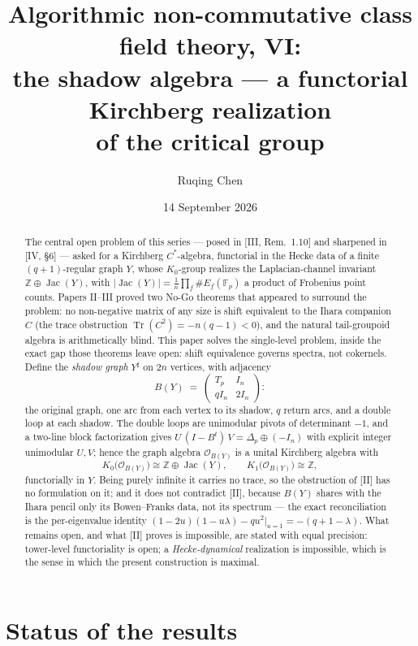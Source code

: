 \documentclass[11pt]{amsart}
\title[Algorithmic non-commutative class field theory, VI]
{Algorithmic non-commutative class field theory, VI:\\
the shadow algebra --- a functorial Kirchberg realization\\ of the critical group}
\author{Ruqing Chen}
\date{14 September 2026}
\numberwithin{equation}{section}
\theoremstyle{definition}
\theoremstyle{remark}
\newcommand{\Z}{\mathbb{Z}}
\newcommand{\F}{\mathbb{F}}
\newcommand{\cO}{\mathcal{O}}
\newcommand{\Jac}{\operatorname{Jac}}
\newcommand{\Tr}{\operatorname{Tr}}
\newcommand{\shadow}{Y^{\sharp}}
\begin{document}
\begin{abstract}
The central open problem of this series --- posed in [III, Rem.~1.10] and sharpened
in [IV, \S6] --- asked for a Kirchberg $C^*$-algebra, functorial in the Hecke data of
a finite $(q+1)$-regular graph $Y$, whose $K_0$-group realizes the Laplacian-channel
invariant $\Z\oplus\Jac(Y)$, with $|\Jac(Y)|=\frac1n\prod_f\#E_f(\F_p)$ a product of
Frobenius point counts. Papers II--III proved two No-Go theorems that appeared to
surround the problem: no non-negative matrix of any size is shift equivalent to the
Ihara companion $C$ (the trace obstruction $\Tr(C^2)=-n(q-1)<0$), and the natural
tail-groupoid algebra is arithmetically blind. This paper solves the single-level
problem, inside the exact gap those theorems leave open: shift equivalence governs
spectra, not cokernels. Define the \emph{shadow graph} $\shadow$ on $2n$ vertices,
with adjacency
\[
B(Y)\;=\;\begin{pmatrix}T_p& I_n\\ qI_n & 2I_n\end{pmatrix}:
\]
the original graph, one arc from each vertex to its shadow, $q$ return arcs, and a
double loop at each shadow. The double loops are unimodular pivots of determinant
$-1$, and a two-line block factorization gives
$U\,(I-B^t)\,V=\Delta_p\oplus(-I_n)$ with explicit integer unimodular $U,V$; hence
the graph algebra $\cO_{B(Y)}$ is a unital Kirchberg algebra with
\[
K_0\bigl(\cO_{B(Y)}\bigr)\cong\Z\oplus\Jac(Y),\qquad
K_1\bigl(\cO_{B(Y)}\bigr)\cong\Z,
\]
functorially in $Y$. Being purely infinite it carries no trace, so the obstruction of
[II] has no formulation on it; and it does not contradict [II], because $B(Y)$ shares
with the Ihara pencil only its Bowen--Franks data, not its spectrum --- the exact
reconciliation is the per-eigenvalue identity
$(1-2u)(1-u\lambda)-qu^2\big|_{u=1}=-(q+1-\lambda)$. What remains open, and what [II]
proves is impossible, are stated with equal precision: tower-level functoriality is
open; a \emph{Hecke-dynamical} realization is impossible, which is the sense in which
the present construction is maximal.
\end{abstract}

\maketitle

\section*{Status of the results}
\end{document}
